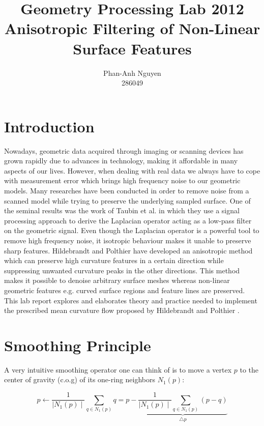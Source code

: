 \documentclass[11pt]{article}
\author{Phan-Anh Nguyen\\
		286049}
\title{Geometry Processing Lab 2012\\
	   Anisotropic Filtering of Non-Linear Surface Features}
\begin{document}
\maketitle



\section{Introduction}

Nowadays, geometric data acquired through imaging or scanning devices has grown rapidly due to advances in technology, making it affordable in many aspects of our lives. However, when dealing with real data we always have to cope with measurement error which brings high frequency noise to our geometric models. Many researches have been conducted in order to remove noise from a scanned model while trying to preserve the underlying sampled surface. One of the seminal results was the work of Taubin et al. \cite{Taubin:1995:SPA:218380.218473} in which they use a signal processing approach to derive the Laplacian operator acting as a low-pass filter on the geometric signal. Even though the Laplacian operator is a powerful tool to remove high frequency noise, it isotropic behaviour makes it unable to preserve sharp features. Hildebrandt and Polthier \cite{Hildebrandt04anisotropicfiltering} have developed an anisotropic method which can preserve high curvature features in a certain direction while suppressing unwanted curvature peaks in the other directions. This method makes it possible to denoise arbitrary surface meshes whereas non-linear geometric features e.g. curved surface regions and feature lines are preserved. This lab report explores and elaborates theory and practice needed to implement the prescribed mean curvature flow proposed by Hildebrandt and Polthier \cite{Hildebrandt04anisotropicfiltering}.

\section{Smoothing Principle}

A very intuitive smoothing operator one can think of is to move a vertex $p$ to the center of gravity (c.o.g) of its one-ring neighbors $N_1(p)$:

\begin{equation}
p \leftarrow \frac{1}{\mid N_1(p) \mid}\sum\limits_{q \in N_1(p)}q = p - \underbrace{\frac{1}{\mid N_1(p) \mid}\sum\limits_{q \in N_1(p)}(p - q)}_{\bigtriangleup p}
\label{eq:update}
\end{equation}
\end{document}
